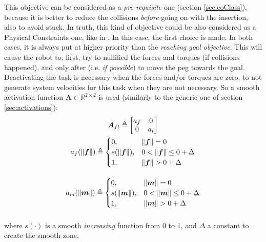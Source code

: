 This objective can be considered as a \textit{pre-requisite} one (section \ref{sec:coClass}), because it is better to reduce the collisions \textit{before} going on with the insertion, also to avoid stuck. In truth, this kind of objective could be also considered as a Physical Constraints one, like in \cite{IntroRecent}. In this case, the first choice is made. In both cases, it is always put at higher priority than the \textit{reaching goal objective}. This will cause the robot to, first, try to nullified the forces and torques (if collisions happened), and only after (i.e. \textit{if possible}) to move the peg towards the goal.\\
Deactivating the task is necessary when the forces and/or torques are zero, to not generate system velocities for this task when they are not necessary. So a smooth activation function $\boldsymbol{A} \in \mathbb{R}^{2 \times 2}$ is used (similarly to the generic one of section \ref{sec:activations}):
\begin{equation}
	\begin{gathered}
		\boldsymbol{A}_{ft} \triangleq
		\begin{bmatrix}
			a_f & 0 \\
			0 & a_t \\
		\end{bmatrix} \\
		\vspace{10px}
		a_f(\| \boldsymbol{f}\|) \triangleq
		\begin{cases}
			0,& \| \boldsymbol{f}\| = 0\\
			s(\| \boldsymbol{f}\|), & 0 < \| \boldsymbol{f}\| \leq 0 + \Delta\\
			1, & \| \boldsymbol{f}\| > 0 + \Delta\\
		\end{cases} \\
		\vspace{10px}
		a_m(\| \boldsymbol{m}\|) \triangleq
		\begin{cases}
			0,& \| \boldsymbol{m}\| = 0\\
			s(\| \boldsymbol{m}\|), & 0 < \| \boldsymbol{m}\| \leq 0 + \Delta\\
			1, & \| \boldsymbol{m}\| > 0 + \Delta\\
		\end{cases}
	\end{gathered}
\end{equation}  
where $s(\cdot)$ is a smooth \textit{increasing} function from 0 to 1, and $\Delta$ a constant to create the smooth zone.\\
